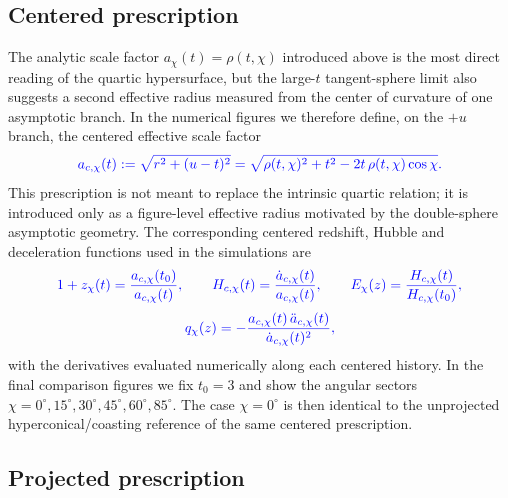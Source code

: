 \documentclass[11pt]{article}
\newcommand{\blue}[1]{{\color{blue}#1}}
\begin{document}
\subsection{\blue{Centered prescription}}

\blue{The analytic scale factor $a_\chi(t)=\rho(t,\chi)$ introduced above is the most direct reading of the quartic hypersurface, but the large-$t$ tangent-sphere limit also suggests a second effective radius measured from the center of curvature of one asymptotic branch. In the numerical figures we therefore define, on the $+u$ branch, the centered effective scale factor}
\begin{equation}
\blue{
a_{c,\chi}(t):=\sqrt{r^2+(u-t)^2}
=\sqrt{\rho(t,\chi)^2+t^2-2t\,\rho(t,\chi)\cos\chi}.
}
\end{equation}
\blue{This prescription is not meant to replace the intrinsic quartic relation; it is introduced only as a figure-level effective radius motivated by the double-sphere asymptotic geometry. The corresponding centered redshift, Hubble and deceleration functions used in the simulations are}
\begin{equation}
\blue{
1+z_\chi(t)=\frac{a_{c,\chi}(t_0)}{a_{c,\chi}(t)},\qquad
H_{c,\chi}(t)=\frac{\dot a_{c,\chi}(t)}{a_{c,\chi}(t)},\qquad
E_\chi(z)=\frac{H_{c,\chi}(t)}{H_{c,\chi}(t_0)},
}
\end{equation}
\begin{equation}
\blue{
q_\chi(z)=-\frac{a_{c,\chi}(t)\,\ddot a_{c,\chi}(t)}{\dot a_{c,\chi}(t)^2},
}
\end{equation}
\blue{with the derivatives evaluated numerically along each centered history. In the final comparison figures we fix $t_0=3$ and show the angular sectors $\chi=0^\circ,15^\circ,30^\circ,45^\circ,60^\circ,85^\circ$. The case $\chi=0^\circ$ is then identical to the unprojected hyperconical/coasting reference of the same centered prescription.}

\subsection{\blue{Projected prescription}}
\end{document}
